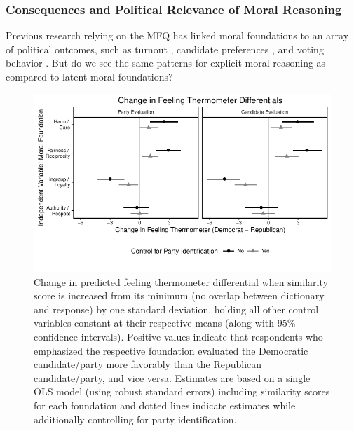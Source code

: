 \documentclass[12pt]{article}
\begin{document}
\subsubsection{Consequences and Political Relevance of Moral Reasoning}

Previous research relying on the MFQ has linked moral foundations to an array of political outcomes, such as turnout \citep{johnson2014ideology}, candidate preferences \citep{iyer2010beyond}, and voting behavior \citep{franks2015using}. But do we see the same patterns for explicit moral reasoning as compared to latent moral foundations?

\begin{figure}[h]\centering
\includegraphics{../calc/fig/ols_feel.pdf}
\caption{Change in predicted feeling thermometer differential when similarity score is increased from its minimum (no overlap between dictionary and response) by one standard deviation, holding all other control variables constant at their respective means (along with 95\% confidence intervals). Positive values indicate that respondents who emphasized the respective foundation evaluated the Democratic candidate/party more favorably than the Republican candidate/party, and vice versa. Estimates are based on a single OLS model (using robust standard errors) including similarity scores for each foundation and dotted lines indicate estimates while additionally controlling for party identification. %
}\label{fig:ols_feel}
\end{figure}
\end{document}

